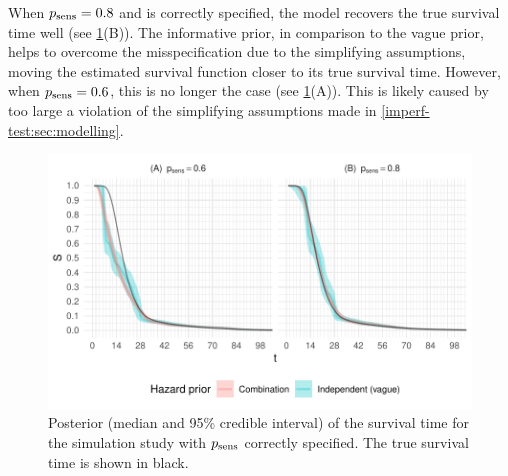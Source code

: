 \documentclass[thesis.tex]{subfiles}
\begin{document}
When $p_\text{sens} = 0.8$ and is correctly specified, the model recovers the true survival time well (see \cref{imperf-test:fig:constant-test-sensitivity}(B)).
The informative prior, in comparison to the vague prior, helps to overcome the misspecification due to the simplifying assumptions, moving the estimated survival function closer to its true survival time.
However, when $p_\text{sens} = 0.6$, this is no longer the case (see \cref{imperf-test:fig:constant-test-sensitivity}(A)).
This is likely caused by too large a violation of the simplifying assumptions made in \cref{imperf-test:sec:modelling}.
\begin{figure}
  \includegraphics[width=\textwidth]{cis-imperfect-testing/sim-constant-sensitivity}
  \caption[Simulation study results with constant test sensitivity]{%
    Posterior (median and 95\% credible interval) of the survival time for the simulation study with $p_\text{sens}$ correctly specified.
    The true survival time is shown in black.
  }
  \label{imperf-test:fig:constant-test-sensitivity}
\end{figure}
\end{document}
